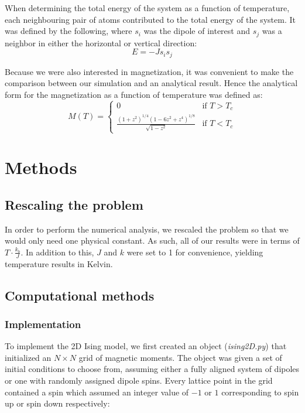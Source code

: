 \documentclass[11pt]{article}
\newcommand\tab[1][.5cm]{\hspace*{#1}}
\begin{document}
When determining the total energy of the system as a function of temperature, each neighbouring pair of atoms contributed to the total energy of the system. It was defined by the following, where $s_i$ was the dipole of interest and $s_j$ was a neighbor in either the horizontal or vertical direction:
\[E= -J s_{i}s_{j}\]

Because we were also interested in magnetization, it was convenient to make the comparison between our simulation and an analytical result. Hence the analytical form for the magnetization as a function of temperature was defined as:
\[M(T) =
  \begin{cases}
                                   0 & \text{if $T>T_{c}$} \\
  \frac{(1+z^{2})^{1/4} (1-6z^{2}+z^{4})^{1/8}}{\sqrt{1-z^{2}}} & \text{if $T<T_{c}$}
  \end{cases}\]

\section{Methods}
\label{sec:methods}

\subsection{Rescaling the problem}
\label{sec:formulation}
\tab In order to perform the numerical analysis, we rescaled the problem so that we would only need one physical constant.  As such, all of our results were in terms of $T \cdot\frac{k_b}{J}$. In addition to this, $J$ and $k$ were set to 1 for convenience, yielding temperature results in Kelvin.

\subsection{Computational methods}
\label{sec:computational}
\subsubsection{Implementation}
\tab To implement the 2D Ising model, we first created an object (\textit{ising2D.py}) that initialized an $N \times N$ grid of magnetic moments. The object was given a set of initial conditions to choose from, assuming either a fully aligned system of dipoles or one with randomly assigned dipole spins. Every lattice point in the grid contained a spin which assumed an integer value of $-1$ or $1$ corresponding to spin up or spin down respectively:
\end{document}
